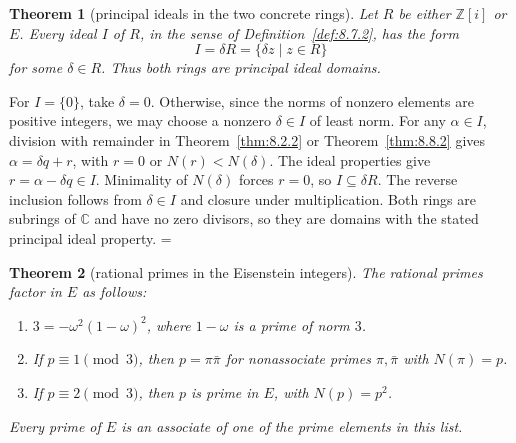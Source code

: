 \documentclass[11pt]{article}
\makeatletter
\theoremstyle{ntstyle}
\newtheorem{theorem}{Theorem}[subsection]
\let\nt@closedisplay\]
\def\nt@guardedclose{\@ifnextchar\par{\nt@closeafterpar}{\@ifnextchar\end{\postdisplaypenalty\@M\nt@closedisplay}{\nt@closedisplay}}}
\def\nt@closeafterpar\par{\@ifnextchar\par{\nt@closeafterpar}{\@ifnextchar\end{\postdisplaypenalty\@M\nt@closedisplay\par}{\nt@closedisplay\par}}}
\renewenvironment{proof}[1][\proofname]{\par
  \pushQED{\qed}\normalfont\topsep\medskipamount\edef\nt@afterproof{\@endparpenalty=\the\@endparpenalty\relax}\@beginparpenalty\@M\@endparpenalty\@M\let\]\nt@guardedclose\trivlist\item[]\textit{#1\@addpunct{.}} \ignorespaces}{\ifvmode\addpenalty\@M\fi\popQED\nt@afterproof\endtrivlist\@endpefalse}
\makeatother
\begin{document}
\begin{theorem}[principal ideals in the two concrete rings]\label{thm:8.8.3}
	Let $R$ be either $\mathbb{Z}[i]$ or $E$. Every ideal $I$ of $R$, in the
	sense of Definition~\ref{def:8.7.2}, has the form
	\[
		I=\delta R=\{\delta z\mid z\in R\}
	\]
	for some $\delta\in R$. Thus both rings are principal ideal domains.
\end{theorem}

\begin{proof}
	For $I=\{0\}$, take $\delta=0$. Otherwise, since the norms of nonzero elements are positive
	integers, we may choose a nonzero
	$\delta\in I$ of least norm.
	For any $\alpha\in I$, division with remainder in
	Theorem~\ref{thm:8.2.2} or Theorem~\ref{thm:8.8.2} gives
	$\alpha=\delta q+r$, with $r=0$ or $N(r)<N(\delta)$.
	The ideal properties give $r=\alpha-\delta q\in I$.
	Minimality of $N(\delta)$ forces $r=0$, so $I\subseteq\delta R$.
	The reverse inclusion follows from $\delta\in I$ and closure under
	multiplication. Both rings are subrings of $\mathbb{C}$ and have no zero
	divisors, so they are domains with the stated principal ideal property.
\end{proof}

\begin{theorem}[rational primes in the Eisenstein integers]\label{thm:8.8.4}
	The rational primes factor in $E$ as follows:
	\begin{enumerate}[label={\alph*)}]
		\item $3=-\omega^2(1-\omega)^2$, where $1-\omega$ is a prime of norm $3$.
		\item If $p\equiv1\pmod{3}$, then $p=\pi\bar\pi$ for nonassociate primes
					$\pi,\bar\pi$ with $N(\pi)=p$.
		\item If $p\equiv2\pmod{3}$, then $p$ is prime in $E$, with $N(p)=p^2$.
	\end{enumerate}
	Every prime of $E$ is an associate of one of the prime elements in this list.
\end{theorem}
\end{document}
